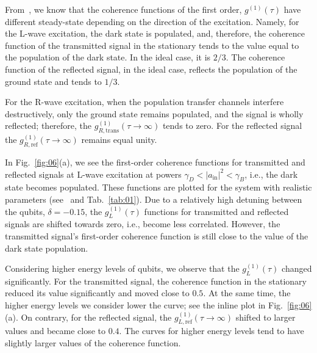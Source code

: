 \documentclass[lettersize,journal]{IEEEtran}
\begin{document}
From~\cite{muller_nonreciprocal_2017}, we know that the coherence functions of the first order, $g^{(1)}(\tau)$ have different steady-state depending on the direction of the excitation.
Namely, for the L-wave excitation, the dark state is populated, and, therefore, the coherence function of the transmitted signal in the stationary tends to the value equal to the population of the dark state.
In the ideal case, it is $2/3$.
The coherence function of the reflected signal, in the ideal case, reflects the population of the ground state and tends to $1/3$.

For the R-wave excitation, when the population transfer channels interfere destructively, only the ground state remains populated, and the signal is wholly reflected; therefore, the $g^{(1)}_{R, \mathrm{trans}}(\tau \rightarrow \infty)$ tends to zero.
For the reflected signal the $g^{(1)}_{R, \mathrm{ref}}(\tau \rightarrow \infty)$ remains equal unity.

In Fig.~\ref{fig:06}(a), we see the first-order coherence functions for transmitted and reflected signals at L-wave excitation at powers $\gamma_D < |a_\mathrm{in}|^2 < \gamma_B$, i.e., the dark state becomes populated.
These functions are plotted for the system with realistic parameters (see~\cite{rosario_hamann_nonreciprocity_2018} and Tab.~\ref{tab:01}).
Due to a relatively high detuning between the qubits, $\delta = - 0.15$, the $g^{(1)}_L(\tau)$ functions for transmitted and reflected signals are shifted towards zero, i.e., become less correlated.
However, the transmitted signal's first-order coherence function is still close to the value of the dark state population.

Considering higher energy levels of qubits, we observe that the $g^{(1)}_L(\tau)$ changed significantly.
For the transmitted signal, the coherence function in the stationary reduced its value significantly and moved close to $0.5$.
At the same time, the higher energy levels we consider lower the curve; see the inline plot in Fig.~\ref{fig:06}(a).
On contrary, for the reflected signal, the $g^{(1)}_{L, \mathrm{ref}}(\tau \rightarrow \infty)$ shifted to larger values and became close to $0.4$.
The curves for higher energy levels tend to have slightly larger values of the coherence function.
\end{document}
